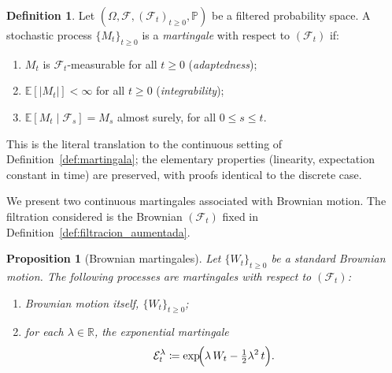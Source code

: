 \documentclass[11pt,a4paper,oneside]{report}
\theoremstyle{plain}
\newtheorem{proposicion}[teorema]{Proposition}
\theoremstyle{definition}
\newtheorem{definicion}[teorema]{Definition}
\theoremstyle{remark}
\newcommand{\R}{\mathbb{R}}
\newcommand{\E}{\mathbb{E}}
\newcommand{\PP}{\mathbb{P}}
\newcommand{\F}{\mathcal{F}}
\newcommand{\1}{\mathbf{1}}
\newcommand{\eqdef}{\coloneqq}
\begin{document}
\medskip

\begin{definicion}
\label{def:martingala_continua}
Let $(\Omega, \F, (\F_t)_{t \geq 0}, \PP)$ be a filtered probability
space. A stochastic process $\{M_t\}_{t \geq 0}$ is a
\emph{martingale} with respect to $(\F_t)$ if:
\begin{enumerate}[label=\textnormal{(\roman*)}]
  \item $M_t$ is $\F_t$-measurable for all $t \geq 0$ (\emph{adaptedness});
  \item $\E[|M_t|] < \infty$ for all $t \geq 0$ (\emph{integrability});
  \item $\E[M_t \mid \F_s] = M_s$ almost surely, for all
        $0 \leq s \leq t$.
\end{enumerate}
\end{definicion}

This is the literal translation to the continuous setting of
Definition~\ref{def:martingala}; the elementary properties
(linearity, expectation constant in time) are preserved, with proofs
identical to the discrete case.

We present two continuous
martingales associated with Brownian motion. The filtration
considered is the Brownian $(\F_t)$ fixed in
Definition~\ref{def:filtracion_aumentada}.

\begin{proposicion}[Brownian martingales]
\label{prop:martingalas_brownianas}
Let $\{W_t\}_{t \geq 0}$ be a standard Brownian motion. The following
processes are martingales with respect to $(\F_t)$:
\begin{enumerate}[label=\textnormal{(\alph*)}]
  \item Brownian motion itself, $\{W_t\}_{t \geq 0}$;
  \item for each $\lambda \in \R$, the \emph{exponential martingale}
        \begin{equation}\label{eq:martingala_exponencial}
          \mathcal{E}_t^{\lambda} \eqdef
          \exp\!\Bigl(\lambda\, W_t - \tfrac{1}{2}\lambda^2\, t\Bigr).
        \end{equation}
\end{enumerate}
\end{proposicion}
\end{document}
